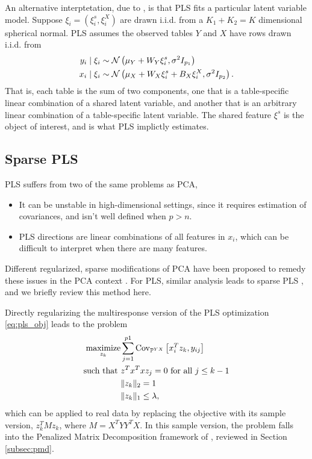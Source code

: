 \documentclass[14pt]{extarticle}
\begin{document}
An alternative interptetation, due to \citep{gustafsson2001probabilistic}, is
that PLS fits a particular latent variable model. Suppose $\xi_{i} =
\left(\xi_{i}^{s}, \xi_{i}^{X}\right)$ are drawn i.i.d. from a $K_{1} + K_{2} =
K$ dimensional spherical normal. PLS assumes the observed tables $Y$ and $X$
have rows drawn i.i.d. from
\begin{align*}
y_{i} \mid \xi_{i} &\sim \mathcal{N}\left(\mu_Y + W_{Y}\xi_{i}^{s}, \sigma^{2}I_{p_{1}}\right) \\
x_{i} \mid \xi_{i} &\sim \mathcal{N}\left(\mu_{X} + W_{X} \xi_{i}^{s} + B_{X}\xi_{i}^{X}, \sigma^{2}I_{p_{2}}\right).
\end{align*}
That is, each table is the sum of two components, one that is a
table-specific linear combination of a shared latent variable, and
another that is an arbitrary linear combination of a table-specific
latent variable. The shared feature $\xi^{s}$ is the object of
interest, and is what PLS implictly estimates.

\subsection{Sparse PLS}
\label{subsec:spls}

PLS suffers from two of the same problems as PCA,
\begin{itemize}
\item It can be unstable in high-dimensional settings, since it requires
  estimation of covariances, and isn't well defined when $p > n$.
\item PLS directions are linear combinations of all features in $x_i$, which can
  be difficult to interpret when there are many features.
\end{itemize}

Different regularized, sparse modifications of PCA have been proposed to remedy
these issues in the PCA context \citep{jolliffe2003modified, zou2006sparse,
  witten2009penalized}. For PLS, similar analysis leads to sparse PLS
\citep{le2008sparse, chun2010sparse}, and we briefly review this method here.

Directly regularizing the multiresponse version of the PLS optimization
\ref{eq:pls_obj} leads to the problem
\begin{align*}
  \mathop\mathrm{maximize}_{z_k} &\sum_{j = 1}^{p1} \mathrm{Cov}_{\mathbb{P}^{YX}}\left[{x_i^T z_k, y_{ij}}\right] \\
  \text{such that }&z^{T}x^{T}x z_{j} = 0 \text{ for all }j \leq k - 1 \\
  &\|z_k\|_2 = 1 \\
  &\|z_k\|_1 \leq \lambda,
\end{align*}
which can be applied to real data by replacing the objective with its sample
version, $z_k^{T} M z_k$, where $M = X^{T}YY^{T}X$. In this sample version, the
problem falls into the Penalized Matrix Decomposition framework of
\citep{witten2009penalized}, reviewed in Section \ref{subsec:pmd}.
\end{document}
